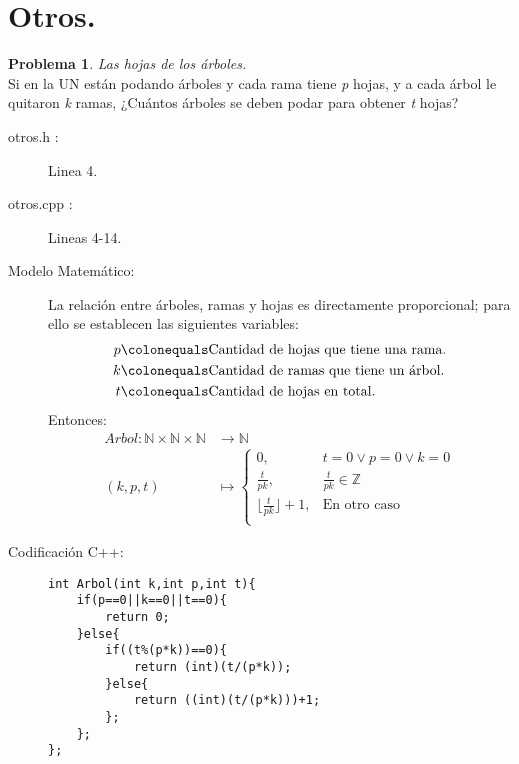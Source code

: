 \documentclass{article}
\theoremstyle{plain}
\theoremstyle{definition}
\newtheorem{problem}{Problema}
\begin{document}
\section{Otros.}

\begin{problem} \emph{Las hojas de los árboles.}\\
\hspace*{7mm}Si en la UN están podando árboles y cada rama tiene \emph{p} hojas, y a cada árbol le quitaron \emph{k} ramas, ¿Cuántos árboles se deben podar para obtener \emph{t} hojas?
\begin{description}
\item[otros.h :] Linea 4. \item[otros.cpp :] Lineas 4-14.

\item[Modelo Matemático:]
La relación entre árboles, ramas y hojas es directamente proporcional; para ello se establecen las siguientes variables:
\begin{align*}
p &\colonequals \text{Cantidad de hojas que tiene una rama.}\\
k &\colonequals \text{Cantidad de ramas que tiene un árbol.}\\
t &\colonequals \text{Cantidad de hojas en total.}
\end{align*}
Entonces:
\begin{align*}
Arbol: \mathbb{N}\times\mathbb{N}\times\mathbb{N} &\to \mathbb{N}\\
(k,p,t) &\mapsto \begin{cases}
0,&t=0\vee p=0 \vee k=0\\
\frac{t}{pk},&\frac{t}{pk}\in\mathbb{Z}\\
\lfloor \frac{t}{pk}\rfloor +1,& \text{En otro caso}\\
\end{cases}
\end{align*}
%
\item[Codificación \textsf{C++}:]\hfill
%
\begin{verbatim}
int Arbol(int k,int p,int t){
    if(p==0||k==0||t==0){
        return 0;
    }else{
        if((t%(p*k))==0){
            return (int)(t/(p*k));
        }else{
            return ((int)(t/(p*k)))+1;
        };
    };
};
\end{verbatim}
\end{description}
\end{problem}
\end{document}
